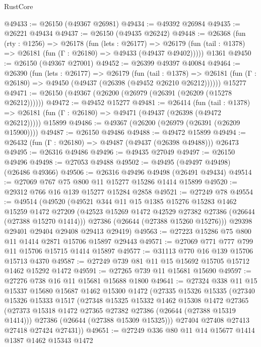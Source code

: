 \begin{lexlean}{RustCore}
\begin{coremodule}
@49433 := @26150 (@49367 @26981)
@49434 := @49392 @26984
@49435 := @26221 @49434
@49437 := @26150 (@49435 @26242)
@49448 := @26368
    (fun (rty : @1256) =>
    @26178
      (fun (lets : @26177) =>
      @26179 (fun (tail : @1378) => @26181 (fun (Γ : @26180) => @49433 (@49437 @49402)))))
    @1361
@49450 := @26150 (@49367 @27001)
@49452 := @26399 @49397 @40084
@49464 := @26390
    (fun (lets : @26177) =>
    @26179
      (fun (tail : @1378) =>
      @26181 (fun (Γ : @26180) => @49450 (@49437 (@26398 (@49452 @26210 @26212))))))
    @15277
@49471 := @26150 (@49367 (@26200 (@26979 (@26391 (@26209 (@15278 @26212))))))
@49472 := @49452 @15277
@49481 := @26414
    (fun (tail : @1378) => @26181 (fun (Γ : @26180) => @49471 (@49437 (@26398 (@49472 @26212)))))
    @15899
@49486 := @49367 (@26200 (@26979 (@26391 (@26209 @15900))))
@49487 := @26150 @49486
@49488 := @49472 @15899
@49494 := @26432 (fun (Γ : @26180) => @49487 (@49437 (@26398 @49488))) @26473
@49495 := @26316 @49486
@49496 := @49435 @27049
@49497 := @26150 @49496
@49498 := @27053 @49488
@49502 := @49495 (@49497 @49498) (@26486 @49366)
@49506 := @26316 @49496 @49498 (@26491 @49434)
@49514 := @27069 @767 @75 @800 @11 @15277 @15286 @1414 @15899
@49520 := @29312 @766 @16 @139 @15277 @15284 @2858
@49521 := @27249 @78
@49554 := @49514
    (@49520
      (@49521
        @344
        @11
        @15
        @1385
        @15276
        @15283
        @1462
        @15259
        @1472
        @27209
        (@42523 @15269 @1472 @42529 @27382 @27386 (@26644 (@27388 @15270 @1414)))
        @27386
        (@26644 (@27388 @15260 @15276)))
      @29398
      @29401
      @29404
      @29408
      @29413
      @29419)
@49563 := @27223 @15286 @75 @800 @11 @1414 @2871 @15706 @15897 @29443
@49571 := @27069 @771 @777 @799 @11 @15706 @15715 @1414 @15897
@49577 := @31113 @770 @16 @139 @15706 @15713 @4370
@49587 := @27249 @739 @81 @11 @15 @15692 @15705 @15712 @1462 @15292 @1472
@49591 := @27265 @739 @11 @15681 @15690
@49597 := @27276 @738 @16 @11 @15681 @15688 @1800
@49641 := @27324
    @338
    @11
    @15
    @15337
    @15680
    @15687
    @1462
    @15300
    @1472
    (@27335
      @15326
      @15335
      (@27340
        @15326
        @15333
        @1517
        (@27348
          @15325
          @15332
          @1462
          @15308
          @1472
          @27365
          (@27373 @15318 @1472 @27365 @27382 @27386 (@26644 (@27388 @15319 @1414)))
          @27386
          (@26644 (@27388 @15309 @15325)))
        @27404
        @27408
        @27413
        @27418
        @27424
        @27431))
@49651 := @27249 @336 @80 @11 @14 @15677 @1414 @1387 @1462 @15343 @1472

\end{coremodule}
\end{lexlean}
